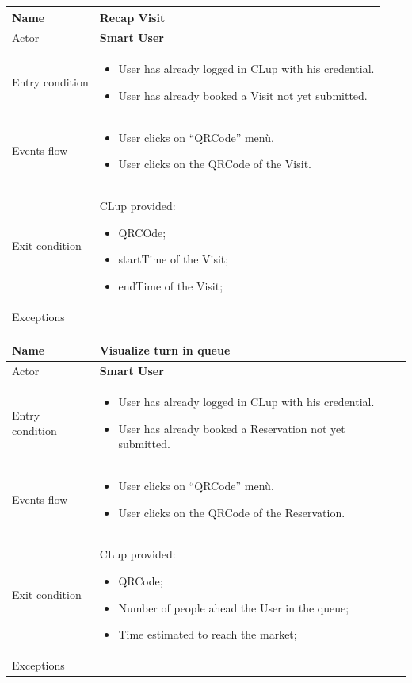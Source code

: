 \begin{tabular}{|p{5cm} | p{7cm} | }
	\hline
	Name & \textbf{Recap Visit} \\
	\hline
	Actor & \textbf{Smart User} \\
	\hline
	Entry condition &
    \begin{itemize}
	    \item User has already logged in CLup with his credential. 
		\item User has already booked a Visit not yet submitted.
        \end{itemize}\\
	\hline
	Events flow & \begin{itemize}
	\item User clicks on “QRCode” menù.
    \item User clicks on the QRCode of the Visit.
    \end{itemize}\\
	\hline
	Exit condition & CLup provided:
    \begin{itemize}
    \item QRCOde;
    \item startTime of the Visit;
    \item endTime of the Visit;
    \end{itemize}\\
	\hline 
	Exceptions & \\
	\hline
\end{tabular}

\par \medskip

\begin{tabular}{|p{5cm} | p{7cm} | }
	\hline
	Name & \textbf{Visualize turn in queue} \\
	\hline
	Actor & \textbf{Smart User} \\
	\hline
	Entry condition &
	\begin{itemize}
	    \item User has already logged in CLup with his credential. 
		\item User has already booked a Reservation not yet submitted.
        \end{itemize}\\
	\hline
	Events flow & 
	\begin{itemize}
	\item User clicks on “QRCode” menù.
    \item User clicks on the QRCode of the Reservation.
    \end{itemize} \\
	\hline
	Exit condition & CLup provided:
    \begin{itemize}
    \item QRCode;
    \item Number of people ahead the User in the queue;
    \item Time estimated to reach the market;
    \end{itemize} \\
	\hline 
	Exceptions & \\
	\hline
\end{tabular}

